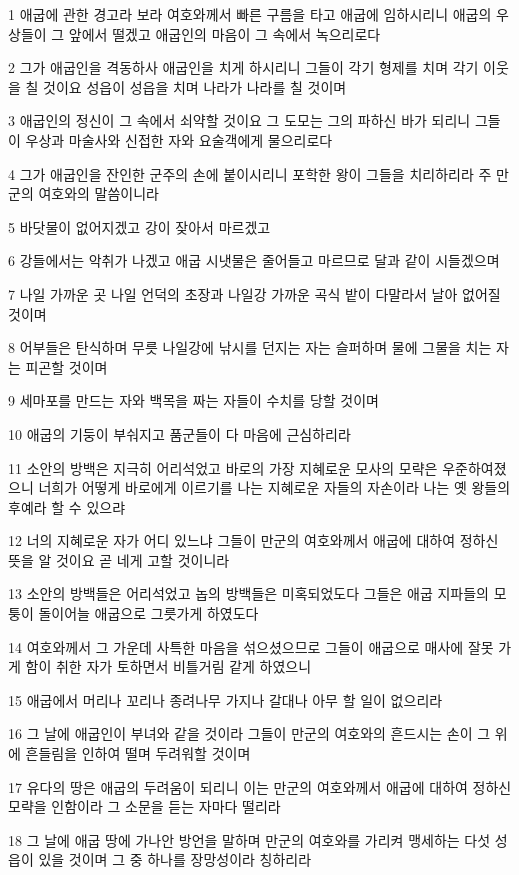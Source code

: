 \par 1 애굽에 관한 경고라 보라 여호와께서 빠른 구름을 타고 애굽에 임하시리니 애굽의 우상들이 그 앞에서 떨겠고 애굽인의 마음이 그 속에서 녹으리로다
\par 2 그가 애굽인을 격동하사 애굽인을 치게 하시리니 그들이 각기 형제를 치며 각기 이웃을 칠 것이요 성읍이 성읍을 치며 나라가 나라를 칠 것이며
\par 3 애굽인의 정신이 그 속에서 쇠약할 것이요 그 도모는 그의 파하신 바가 되리니 그들이 우상과 마술사와 신접한 자와 요술객에게 물으리로다
\par 4 그가 애굽인을 잔인한 군주의 손에 붙이시리니 포학한 왕이 그들을 치리하리라 주 만군의 여호와의 말씀이니라
\par 5 바닷물이 없어지겠고 강이 잦아서 마르겠고
\par 6 강들에서는 악취가 나겠고 애굽 시냇물은 줄어들고 마르므로 달과 같이 시들겠으며
\par 7 나일 가까운 곳 나일 언덕의 초장과 나일강 가까운 곡식 밭이 다말라서 날아 없어질 것이며
\par 8 어부들은 탄식하며 무릇 나일강에 낚시를 던지는 자는 슬퍼하며 물에 그물을 치는 자는 피곤할 것이며
\par 9 세마포를 만드는 자와 백목을 짜는 자들이 수치를 당할 것이며
\par 10 애굽의 기둥이 부숴지고 품군들이 다 마음에 근심하리라
\par 11 소안의 방백은 지극히 어리석었고 바로의 가장 지혜로운 모사의 모략은 우준하여졌으니 너희가 어떻게 바로에게 이르기를 나는 지혜로운 자들의 자손이라 나는 옛 왕들의 후예라 할 수 있으랴
\par 12 너의 지혜로운 자가 어디 있느냐 그들이 만군의 여호와께서 애굽에 대하여 정하신 뜻을 알 것이요 곧 네게 고할 것이니라
\par 13 소안의 방백들은 어리석었고 놉의 방백들은 미혹되었도다 그들은 애굽 지파들의 모퉁이 돌이어늘 애굽으로 그릇가게 하였도다
\par 14 여호와께서 그 가운데 사특한 마음을 섞으셨으므로 그들이 애굽으로 매사에 잘못 가게 함이 취한 자가 토하면서 비틀거림 같게 하였으니
\par 15 애굽에서 머리나 꼬리나 종려나무 가지나 갈대나 아무 할 일이 없으리라
\par 16 그 날에 애굽인이 부녀와 같을 것이라 그들이 만군의 여호와의 흔드시는 손이 그 위에 흔들림을 인하여 떨며 두려워할 것이며
\par 17 유다의 땅은 애굽의 두려움이 되리니 이는 만군의 여호와께서 애굽에 대하여 정하신 모략을 인함이라 그 소문을 듣는 자마다 떨리라
\par 18 그 날에 애굽 땅에 가나안 방언을 말하며 만군의 여호와를 가리켜 맹세하는 다섯 성읍이 있을 것이며 그 중 하나를 장망성이라 칭하리라
